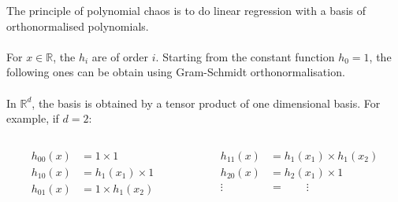 \documentclass{beamer}
\begin{document}
\begin{frame}{}
The principle of polynomial chaos is to do linear regression with a basis of orthonormalised polynomials. \\ \vspace{3mm}
\\
For $x \in \mathds{R}$, the $h_i$ are of order $i$. Starting from the constant function $h_0 =1$, the following ones can be obtain using Gram-Schmidt orthonormalisation.\\ \vspace{3mm}
\\
In $\mathds{R}^d$, the basis is obtained by a tensor product of one dimensional basis. For example, if $d=2$:
\begin{center}
\begin{columns}[c]
\begin{column}{5cm}
\begin{equation*}
  \begin{split}
    h_{00}(x) & = 1 \times 1 \\
    h_{10}(x) & = h_{1}(x_1)\times 1 \\
    h_{01}(x) & = 1 \times h_{1}(x_2) \\
  \end{split}
\end{equation*}
\end{column}
\begin{column}{5cm}
\begin{equation*}
  \begin{split}
    h_{11}(x) & = h_{1}(x_1) \times h_{1}(x_2) \\
    h_{20}(x) & = h_{2}(x_1)\times 1 \\
    \vdots \quad & = \qquad \vdots
  \end{split}
\end{equation*}
\end{column}
\end{columns} 
\end{center}
\end{frame}
\end{document}

